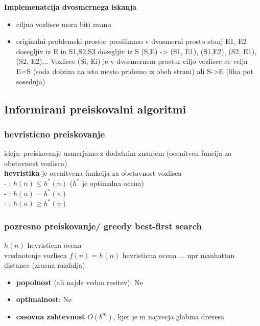 \textbf{Implemenatcija dvosmernega iskanja}

\begin{itemize}[noitemsep,topsep=0pt,leftmargin=*]
    \item ciljno vozlisce mora biti znano
    \item originalni problemski prostor preslikamo v dvosmerni prosto stanj
    E1, E2 dosegljiv iz E in S1,S2,S3 dosegljiv iz S
    (S,E) -> {(S1, E1), (S1,E2), (S2, E1), (S2, E2)...}
    Vozlisce (Si, Ei) je v dvosmernem prostur ciljo vozlisce ce velja E=S (soda dolzina na isto mesto pridemo iz obeh strani) ali S->E (liha pot sosednja)
\end{itemize}


\subsection{Informirani preiskovalni algoritmi}

\subsubsection{hevristicno preiskovanje}
ideja: preiskovanje usmerjamo z dodatnim znanjem (ocenitven funcija za obetavnost vozlisca)\\
\textbf{hevristika} je ocenitvena funkcija za obetavnost vozlisca\\
- : $h(n) \leq h^*(n)$ ($h^*$ je optimalna ocena)\\
- : $h(n) = h^*(n)$\\
- : $h(n) \geq h^*(n)$\\


\subsubsection{pozresno preiskovanje/ greedy best-first search}
$h(n)$ hevristicna ocena\\
vrednotenje vozlisca $f(n)=h(n)$
hevristicna ocena ... npr manhattan distance (zracna razdalja)

\begin{itemize}[noitemsep,topsep=0pt,leftmargin=*]
    \item \textbf{popolnost} (ali najde vedno resitev): Ne
    \item \textbf{optimalnost}: Ne
    \item \textbf{casovna zahtevnost} $O(b^m)$, kjer je m najvecja globina drevesa
\end{itemize}

